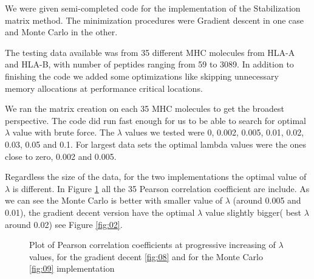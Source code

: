 \documentclass{bioinfo}
\begin{document}
\begin{application}
We were given semi-completed code for the implementation of the Stabilization matrix method. The minimization procedures were Gradient descent in one case and Monte Carlo in the other. 
\par The testing data available was from 35 different MHC molecules from HLA-A and HLA-B, with number of peptides ranging from 59 to 3089. In addition to finishing the code we added some optimizations like skipping unnecessary memory allocations at performance critical locations.
\par We ran the matrix creation on each 35 MHC molecules to get the broadest perspective. The code did run fast enough for us to be able to search for optimal $\lambda$ value with brute force. The $\lambda$ values we tested were 0, 0.002, 0.005, 0.01, 0.02, 0.03, 0.05 and 0.1. For largest data sets the optimal lambda values were the ones close to zero, 0.002 and 0.005.
\par Regardless the size of the data, for the two implementations the optimal value of $\lambda$ is different. In Figure \ref{fig:07} all the 35 Pearson correlation coefficient are include. As we can see the Monte Carlo is better with smaller value of $\lambda$ (around 0.005 and 0.01), the gradient decent version have the optimal $\lambda$ value slightly bigger( best $\lambda$ around 0.02) see Figure \ref{fig:02}.



\begin{figure}[!tpb]
\begin{center}
\end{center}
\caption{Plot of Pearson correlation coefficients at progressive increasing of $\lambda$ values, for the gradient decent \ref{fig:08} and for the Monte Carlo \ref{fig:09} implementation}
\label{fig:07}
\end{figure}


\end{application}
\end{document}
